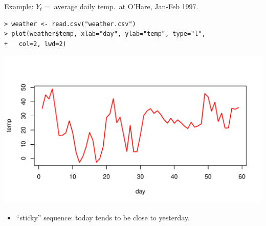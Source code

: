 \documentclass[12pt,xcolor=svgnames]{beamer}
\newcommand{\bl}{\color{blue}}
\newcommand{\nochap}{\vspace{0.5cm}}
\newcommand{\nsk}{\vspace{-.4cm}}
\begin{document}
\begin{frame}[fragile]
\nochap

\vspace{-0.2cm}
{\bl Example:} $Y_t = $ average daily temp.~at O'Hare, Jan-Feb 1997.

{\bl \footnotesize
\begin{verbatim}
> weather <- read.csv("weather.csv")
> plot(weather$temp, xlab="day", ylab="temp", type="l", 
+   col=2, lwd=2)
\end{verbatim}
}

\begin{center}
\includegraphics[scale=0.58,trim=10 20 0 55]{weather_new}
\end{center}

\nsk
\begin{itemize}
\item ``sticky'' sequence: today tends to be close to yesterday.
\end{itemize}

\end{frame}
\end{document}
